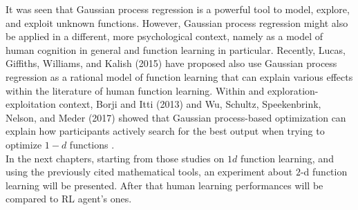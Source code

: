 It was seen that Gaussian process regression is a powerful tool to model, explore, and exploit unknown functions. However, Gaussian process regression might also be applied in a different, more psychological context, namely as a model of human cognition in general and function learning in particular. Recently, Lucas, Giffiths, Williams, and Kalish (2015) have proposed also use Gaussian process regression as a rational model of function learning that can explain various effects within the literature of human function learning. Within and exploration-exploitation context, Borji and Itti (2013) and Wu, Schultz, Speekenbrink, Nelson, and Meder (2017) showed that Gaussian process-based optimization can explain how participants actively search for the best output when trying to optimize $1-d$ functions \cite{Schulz095190}.\\

In the next chapters, starting from those studies on $1d$ function learning, and using the previously cited mathematical tools, an experiment about $2$-d function learning will be presented. After that human learning performances will be compared to RL agent's ones.